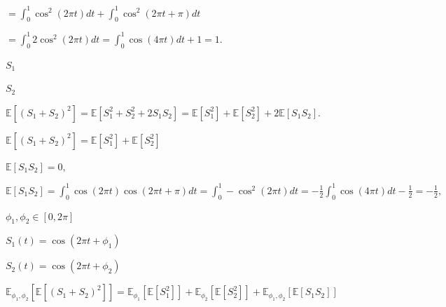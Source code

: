 \documentclass{article}
\def\lthtmlcheckvsize{\ifdim\ht\sizebox<\vsize 
  \ifdim\wd\sizebox<\hsize\expandafter\hfill\fi \expandafter\vfill
  \else\expandafter\vss\fi}%
\begin{document}
{\newpage\clearpage
{}%
$\displaystyle =   \int_0^1 \cos^2(2 \pi t) dt + \int_0^1 \cos^2(2 \pi  t + \pi) dt$%
\lthtmlindisplaymathZ
\lthtmlcheckvsize\clearpage}

{\newpage\clearpage
{}%
$\displaystyle = \int_0^1 2 \cos^2(2 \pi t)  dt= \int_0^1 \cos(4 \pi t)dt + 1 = 1.$%
\lthtmlindisplaymathZ
\lthtmlcheckvsize\clearpage}

{\newpage\clearpage
{}%
$ S_1$%
\lthtmlindisplaymathZ
\lthtmlcheckvsize\clearpage}

{\newpage\clearpage
{}%
$ S_2$%
\lthtmlindisplaymathZ
\lthtmlcheckvsize\clearpage}

{\newpage\clearpage
{}%
$\displaystyle \mathbb{E}[(S_1 + S_2)^2] = \mathbb{E}[S_1^2 + S_2^2 + 2 S_1 S_2]= \mathbb{E}[S_1^2] + \mathbb{E}[S_2^2] + 2 \mathbb{E}[S_1 S_2].$%
\lthtmlindisplaymathZ
\lthtmlcheckvsize\clearpage}

{\newpage\clearpage
{}%
$ \mathbb{E}[(S_1 + S_2)^2] = \mathbb{E}[S_1^2] + \mathbb{E}[S_2^2] $%
\lthtmlindisplaymathZ
\lthtmlcheckvsize\clearpage}

{\newpage\clearpage
{}%
$ \mathbb{E}[S_1 S_2] = 0,$%
\lthtmlindisplaymathZ
\lthtmlcheckvsize\clearpage}

{\newpage\clearpage
{}%
$\displaystyle \mathbb{E}[S_1S_2] = \int_0^1 \cos(2 \pi t) \cos(2 \pi t + \pi) dt =\int_0^1 -\cos^2(2 \pi t )dt = - \frac{1}{2}\int_0^1 \cos(4 \pi t)dt - \frac{1}{2} = - \frac{1}{2},
$%
\lthtmlindisplaymathZ
\lthtmlcheckvsize\clearpage}

{\newpage\clearpage
{}%
$ \phi_1,\phi_2 \in [0,2 \pi]$%
\lthtmlindisplaymathZ
\lthtmlcheckvsize\clearpage}

{\newpage\clearpage
{}%
$ S_1(t) = \cos(2 \pi t + \phi_1)$%
\lthtmlindisplaymathZ
\lthtmlcheckvsize\clearpage}

{\newpage\clearpage
{}%
$ S_2(t) = \cos(2 \pi t + \phi_2)$%
\lthtmlindisplaymathZ
\lthtmlcheckvsize\clearpage}

{\newpage\clearpage
{}%
$\displaystyle \mathbb{E}_{\phi_1,\phi_2} \left[\mathbb{E}[(S_1 + S_2)^2]\right] = \mathbb{E}_{\phi_1} \left[\mathbb{E}\left[ S_1^2\right]\right] + \mathbb{E}_{\phi_2} \left[\mathbb{E}\left[ S_2^2\right]\right] +\mathbb{E}_{\phi_1,\phi_2} \left[\mathbb{E}\left[ S_1S_2\right]\right]$%
\lthtmlindisplaymathZ
\lthtmlcheckvsize\clearpage}
\end{document}
